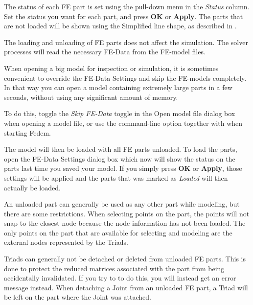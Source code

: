 The status of each FE part is set using the pull-down menu in the {\sl Status}
column. Set the status you want for each part,
and press \textbf{OK} or \textbf{Apply}.
The parts that are not loaded will be shown using the Simplified line shape,
as described in .

The loading and unloading of FE parts does not affect the simulation.
The solver processes will read the necessary FE-Data from the FE-model files.





When opening a big model for inspection or simulation, it is sometimes
convenient to override the FE-Data Settings and skip the FE-models
completely. In that way you can open a model containing extremely large
parts in a few seconds, without using any significant amount of memory.

To do this, toggle the {\sl Skip FE-Data} toggle in the Open model file dialog
box when opening a model file, or use the  command-line option
together with  when starting Fedem.

The model will then be loaded with all FE parts unloaded. To load the parts,
open the FE-Data Settings dialog box which now will show the status on the
parts last time you saved your model. If you simply press \textbf{OK} or
\textbf{Apply}, those settings will be applied and the parts that was marked as
{\sl Loaded} will then actually be loaded.



An unloaded part can generally be used as any other part while modeling,
but there are some restrictions.
When selecting points on the part, the points will not snap to the closest node
because the node information has not been loaded.
The only points on the part that are available for selecting and modeling are
the external nodes represented by the Triads.

Triads can generally not be detached or deleted from unloaded FE parts.
This is done to protect the reduced matrices associated with the part
from being accidentally invalidated.
If you try to to do this, you will instead get an error message instead.
When detaching a Joint from an unloaded FE part,
a Triad will be left on the part where the Joint was attached.


